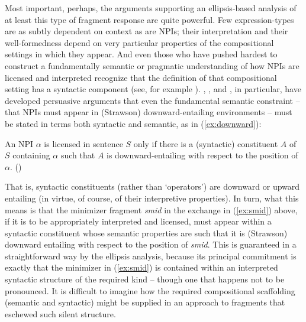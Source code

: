 \documentclass[output=paper,colorlinks,citecolor=brown]{langscibook}
\begin{document}
Most important, perhaps, the arguments supporting an ellipsis-based analysis of at least this type of fragment response are quite powerful.  Few expression-types are as subtly dependent on context as are NPIs; their interpretation and their well-formedness depend on very particular properties of the compositional settings in which they appear.  And even those who have pushed hardest to construct a fundamentally semantic or pragmatic understanding of how NPIs are licensed and interpreted recognize that the definition of that compositional setting has a syntactic component (see, for example \cite[206--207]{ladusaw:79}). \citet{gajewski:05}, \citet{homer:11}, and \citet{homer:21a}, in particular, have developed persuasive arguments that even the fundamental semantic constraint -- that NPIs must appear in (Strawson) downward-entailing environments -- must be stated in terms both syntactic and semantic, as in (\ref{ex:downward}):

\ea\label{ex:downward}
An NPI $\alpha$ is licensed in sentence $S$ only if there is a (syntactic) constituent $A$ of $S$ containing $\alpha$ such that $A$ is downward-entailing with respect to the position of $\alpha$. (\cite[5]{homer:21a})
\z


\noindent That is, syntactic constituents (rather than `operators') are downward or upward entailing (in virtue, of course, of their interpretive properties). In turn, what this means is that the minimizer fragment {\itshape smid} in the exchange in (\ref{ex:smid}) above, if it is to be appropriately interpreted and licensed, must appear within a syntactic constituent whose semantic properties are such that it is (Strawson) downward entailing  with respect to the position of {\itshape smid}.  This is guaranteed in a straightforward way by the ellipsis analysis, because its principal commitment is exactly that the minimizer in (\ref{ex:smid}) is contained within an interpreted syntactic structure of the required kind -- though one that happens not to be pronounced. It is difficult to imagine how the required compositional scaffolding (semantic and syntactic) might be supplied in an approach to fragments that eschewed such silent structure. 
\end{document}
